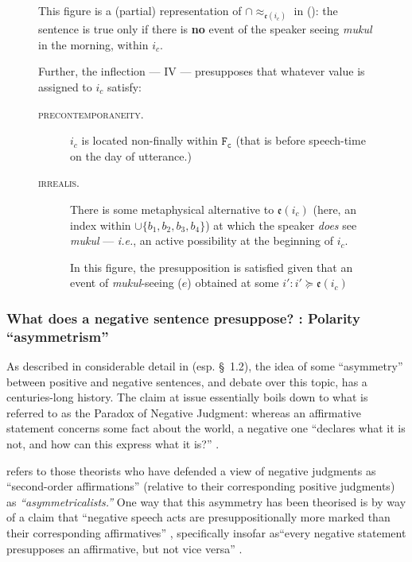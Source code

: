 \begin{figure}[h]
{\par
}


This figure is a (partial) representation of $ \cap{\approx_{\mathfrak{e}(i_c)}} $ in (\lastx): the sentence is true only if there is \textbf{no} event of the speaker seeing \textit{mukul} in the morning, within $ i_c $.

Further, the inflection --- \gls{IV} --- presupposes that whatever value is assigned to $ i_c $ satisfy:\begin{description}
	\item[\textsc{precontemporaneity.}] $ i_c $ is located non-finally within $ \mathtt{F_c} $ (that is before speech-time on the day of utterance.)
	\item[\textsc{irrealis.}] There is some metaphysical alternative to $ \mathfrak{e}(i_c) $ (here, an index within $ \cup\{b_1,b_2,b_3,b_4\} $) at which the speaker \textit{does} see \textit{mukul} --- \textit{i.e.}, an active possibility at the beginning of $ i_c $. 
	
	In this figure, the presupposition is satisfied given that an event of \textit{mukul}-seeing ($ e $) obtained at some $ i' : i'\succcurlyeq \mathfrak{e}(i_c)$ %
	\end{description}
\end{figure}


\subsubsection*{What does a negative sentence presuppose? : Polarity ``asymmetrism''} As described in considerable detail in \citealt{Horn2001} (esp. \S~1.2), the idea of some ``asymmetry'' between positive and negative sentences, and debate over this topic, has a centuries-long history. The claim at issue essentially boils down to what is referred to as the Paradox of Negative Judgment: whereas an affirmative statement concerns some fact about the world, a negative one ``declares what it is not, and how can this express what it is?'' \citetext{\citealp[49]{Horn2001}, citing \citealp[171]{Joseph1916}}.

\citeauthor{Horn2001} refers to those theorists who have defended a view of negative judgments as ``second-order affirmations'' (relative to their corresponding positive judgments) as \textit{``asymmetricalists.''} One way that this asymmetry has been theorised is by way of a claim that ``negative speech acts are presuppositionally more marked than their corresponding affirmatives'' \citep[70]{Givon1975}, specifically insofar as``every negative statement presupposes an affirmative, but not vice versa'' \citep[64]{Horn2001}.

